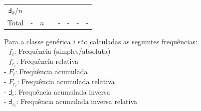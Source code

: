 \documentclass[
]{book}
\theoremstyle{definition}
\theoremstyle{definition}
\theoremstyle{definition}
\theoremstyle{remark}
\begin{document}
\begin{longtable}[]{@{}cccccccc@{}}
\begin{minipage}[t]{0.10\columnwidth}
\(\Finv_{k}/n\)\strut
\end{minipage}\tabularnewline
\begin{minipage}[t]{0.06\columnwidth}\centering
Total\strut
\end{minipage} & \begin{minipage}[t]{0.06\columnwidth}\centering
-\strut
\end{minipage} & \begin{minipage}[t]{0.06\columnwidth}\centering
\(n\)\strut
\end{minipage} & \begin{minipage}[t]{0.07\columnwidth}\centering
1\strut
\end{minipage} & \begin{minipage}[t]{0.15\columnwidth}\centering
-\strut
\end{minipage} & \begin{minipage}[t]{0.07\columnwidth}\centering
-\strut
\end{minipage} & \begin{minipage}[t]{0.20\columnwidth}\centering
-\strut
\end{minipage} & \begin{minipage}[t]{0.10\columnwidth}\centering
-\strut
\end{minipage}\tabularnewline
\bottomrule
\end{longtable}

Para a classe genérica \(i\) são calculadas as seguintes frequências:\\
- \(f_{i}\): Frequência (simples/absoluta)\\
- \(f_{r_{i}}\): Frequência relativa\\
- \(F_{i}\): Frequência acumulada\\
- \(F_{r_{i}}\): Frequência acumulada relativa\\
- \(\Finv_{i}\): Frequência acumulada inversa\\
- \(\Finv_{r_{i}}\): Frequência acumulada inversa relativa
\end{document}
